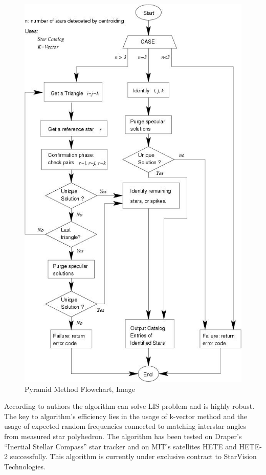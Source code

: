 \documentclass[12pt,a4paper,oneside]{article}
\begin{document}
\begin{figure}[!htbp]
\includegraphics[scale=0.57]{pyramid_method.jpg}
\centering
\caption{Pyramid Method Flowchart, Image \citet{mortari2004pyramid}}
\label{fig:pyramid_method}
\end{figure}

According to authors the algorithm can solve LIS problem and is highly robust. The key to algorithm's efficiency lies in the usage of k-vector method and the usage of expected random frequencies connected to matching interstar angles from measured star polyhedron. The algorithm has been tested on Draper’s “Inertial Stellar Compass” star tracker\cite{brady2002inertial} and on MIT’s satellites HETE and HETE-2\cite{crew2002hete} successfully. This algorithm is currently under exclusive contract to StarVision Technologies\cite{jacox2006method}\cite{pyramid-starvision}.
\end{document}
